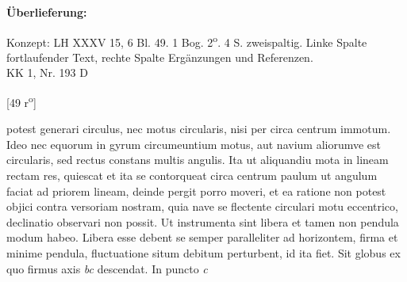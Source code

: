    
        
        \begin{ledgroupsized}[r]{120mm}
        \footnotesize 
        \pstart        
        \noindent\textbf{\"{U}berlieferung:}  
        \pend
        \end{ledgroupsized}
      
       
              \begin{ledgroupsized}[r]{114mm}
              \footnotesize 
              \pstart \parindent -6mm
              Konzept: LH XXXV 15, 6 Bl. 49. 1 Bog. 2\textsuperscript{o}. 4 S. zweispaltig. Linke Spalte fortlaufender Text, rechte Spalte Erg\"{a}nzungen und Referenzen.\\KK 1, Nr. 193 D \pend
              \end{ledgroupsized}
        \vspace*{8mm}
        \pstart 
        \normalsize
      \begin{center}[49 r\textsuperscript{o}] \end{center}
      \pend 
      \vspace{1.0ex} 
      \pstart {} potest generari circulus, nec motus circularis, nisi per  circa centrum immotum. Ideo nec equorum in gyrum circumeuntium motus, aut navium\protect{} aliorumve est circularis, sed rectus constans multis angulis. Ita ut aliquandiu mota in lineam rectam res, quiescat et ita se contorqueat circa centrum paulum ut angulum faciat ad priorem lineam, deinde pergit porro moveri, et ea ratione non potest objici contra versoriam nostram, quia nave se flectente circulari motu eccentrico, declinatio\protect{} observari non possit.
      \pend 
      \pstart Ut instrumenta sint libera et tamen non pendula modum habeo. Libera esse debent  se semper paralleliter ad horizontem, firma et minime pendula,  fluctuatione situm debitum perturbent, id ita fiet. Sit globus ex quo firmus axis \textit{bc} descendat. In puncto \textit{c}
